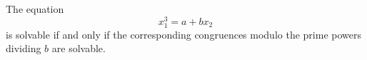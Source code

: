 \begin{proposition}\label{eq:093}
    The equation
\[
    x_1^3=a+bx_2
\]
    is solvable if and only if the corresponding congruences modulo the prime powers dividing $b$ are solvable.
\end{proposition}
